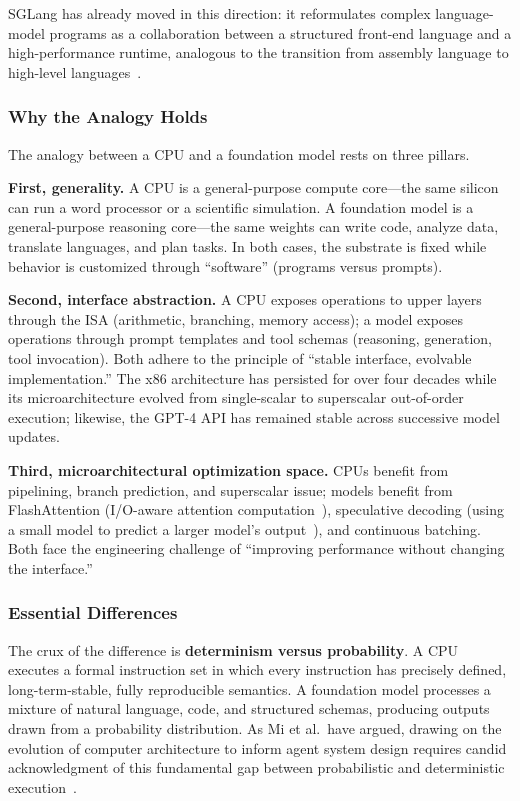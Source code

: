\documentclass[11pt,a4paper]{article}
\begin{document}
SGLang has already moved in this direction: it reformulates complex language-model programs as a collaboration between a structured front-end language and a high-performance runtime, analogous to the transition from assembly language to high-level languages~\cite{sglang2024,sglang_docs_2026}.

\subsubsection{Why the Analogy Holds}

The analogy between a CPU and a foundation model rests on three pillars.

\textbf{First, generality.}
A CPU is a general-purpose compute core---the same silicon can run a word processor or a scientific simulation.
A foundation model is a general-purpose reasoning core---the same weights can write code, analyze data, translate languages, and plan tasks.
In both cases, the substrate is fixed while behavior is customized through ``software'' (programs versus prompts).

\textbf{Second, interface abstraction.}
A CPU exposes operations to upper layers through the ISA (arithmetic, branching, memory access); a model exposes operations through prompt templates and tool schemas (reasoning, generation, tool invocation).
Both adhere to the principle of ``stable interface, evolvable implementation.'' The x86 architecture has persisted for over four decades while its microarchitecture evolved from single-scalar to superscalar out-of-order execution; likewise, the GPT-4 API has remained stable across successive model updates.

\textbf{Third, microarchitectural optimization space.}
CPUs benefit from pipelining, branch prediction, and superscalar issue; models benefit from FlashAttention (I/O-aware attention computation~\cite{dao2022flashattention}), speculative decoding (using a small model to predict a larger model's output~\cite{leviathan2023speculative}), and continuous batching.
Both face the engineering challenge of ``improving performance without changing the interface.''

\subsubsection{Essential Differences}

The crux of the difference is \textbf{determinism versus probability}.
A CPU executes a formal instruction set in which every instruction has precisely defined, long-term-stable, fully reproducible semantics.
A foundation model processes a mixture of natural language, code, and structured schemas, producing outputs drawn from a probability distribution.
As Mi et al.\ have argued, drawing on the evolution of computer architecture to inform agent system design requires candid acknowledgment of this fundamental gap between probabilistic and deterministic execution~\cite{mi2025llmagentscomputersystems}.
\end{document}
